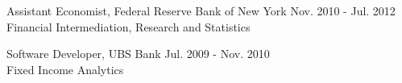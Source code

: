 \documentclass[12pt]{res} %
\begin{document}
\begin{resume}
Assistant Economist, Federal Reserve Bank of New York \hfill Nov. 2010 - Jul. 2012\\ Financial Intermediation, Research and Statistics

Software Developer, UBS Bank \hfill Jul. 2009 - Nov. 2010\\
Fixed Income Analytics









\end{resume} 
\end{document}
